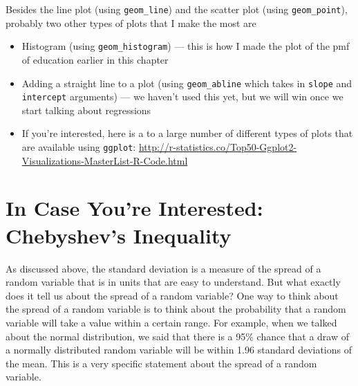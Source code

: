 \documentclass[
  letterpaper,
  DIV=11,
  numbers=noendperiod]{scrreprt}
\begin{document}
Besides the line plot (using \texttt{geom\_line}) and the scatter plot
(using \texttt{geom\_point}), probably two other types of plots that I
make the most are

\begin{itemize}
\item
  Histogram (using \texttt{geom\_histogram}) --- this is how I made the
  plot of the pmf of education earlier in this chapter
\item
  Adding a straight line to a plot (using \texttt{geom\_abline} which
  takes in \texttt{slope} and \texttt{intercept} arguments) --- we
  haven't used this yet, but we will win once we start talking about
  regressions
\item
  If you're interested, here is a to a large number of different types
  of plots that are available using \texttt{ggplot}:
  \url{http://r-statistics.co/Top50-Ggplot2-Visualizations-MasterList-R-Code.html}
\end{itemize}

\section{In Case You're Interested: Chebyshev's
Inequality}\label{in-case-youre-interested-chebyshevs-inequality}

As discussed above, the standard deviation is a measure of the spread of
a random variable that is in units that are easy to understand. But what
exactly does it tell us about the spread of a random variable? One way
to think about the spread of a random variable is to think about the
probability that a random variable will take a value within a certain
range. For example, when we talked about the normal distribution, we
said that there is a 95\% chance that a draw of a normally distributed
random variable will be within 1.96 standard deviations of the mean.
This is a very specific statement about the spread of a random variable.
\end{document}
